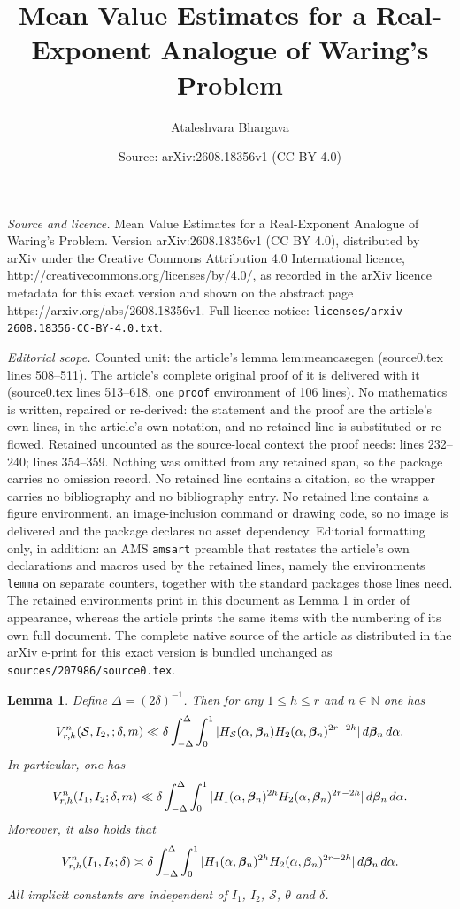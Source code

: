 \documentclass[10pt,a4paper]{amsart}
\title{Mean Value Estimates for a Real-Exponent Analogue of Waring's Problem}
\author{Ataleshvara Bhargava}
\date{Source: arXiv:2608.18356v1 (CC BY 4.0)}
\newtheorem{lemma}{Lemma}
\renewcommand{\d}{\,{\rm d}}
\begin{document}
\maketitle

\noindent\emph{Source and licence.} Mean Value Estimates for a Real-Exponent Analogue of Waring's Problem. Version arXiv:2608.18356v1 (CC BY 4.0), distributed by arXiv under the Creative Commons Attribution 4.0 International licence, http://creativecommons.org/licenses/by/4.0/, as recorded in the arXiv licence metadata for this exact version and shown on the abstract page https://arxiv.org/abs/2608.18356v1. Full licence notice: \texttt{licenses/arxiv-2608.18356-CC-BY-4.0.txt}.\par\smallskip

\noindent\textit{Editorial scope.} Counted unit: the article's lemma lem:meancasegen (source0.tex lines 508--511). The article's complete original proof of it is delivered with it (source0.tex lines 513--618, one \texttt{proof} environment of 106 lines). No mathematics is written, repaired or re-derived: the statement and the proof are the article's own lines, in the article's own notation, and no retained line is substituted or re-flowed.  Retained uncounted as the source-local context the proof needs: lines 232--240; lines 354--359.  Nothing was omitted from any retained span, so the package carries no omission record.  No retained line contains a citation, so the wrapper carries no bibliography and no bibliography entry.  No retained line contains a figure environment, an image-inclusion command or drawing code, so no image is delivered and the package declares no asset dependency.  Editorial formatting only, in addition: an AMS \texttt{amsart} preamble that restates the article's own declarations and macros used by the retained lines, namely the environments \texttt{lemma} on separate counters, together with the standard packages those lines need.  The retained environments print in this document as Lemma 1 in order of appearance, whereas the article prints the same items with the numbering of its own full document.  The complete native source of the article as distributed in the arXiv e-print for this exact version is bundled unchanged as \texttt{sources/207986/source0.tex}.
\begin{lemma} \label{lem:poulcount}
Define $\Delta = (2\delta)^{-1}$. Then for any $1\leq h \leq r$ and $n \in \mathbb{N}$ one has 
\[ V_{r,h}^n(\mathcal{S}, I_2,;\delta,m) \ll \delta \int_{-\Delta}^{\Delta} \int_0^1 |H_{\mathcal{S}}(\alpha,\boldsymbol{\beta}_n)H_2(\alpha,\boldsymbol{\beta}_n)^{2r-2h}| \d \boldsymbol{\beta}_n \d \alpha. \]
In particular, one has 
\[ V_{r,h}^n(I_1, I_2; \delta,m) \ll \delta \int_{-\Delta}^{\Delta} \int_0^1 |H_1(\alpha,\boldsymbol{\beta}_n)^{2h} H_2(\alpha,\boldsymbol{\beta}_n)^{2r-2h}| \d \boldsymbol{\beta}_n \d \alpha. \]
Moreover, it also holds that 
\[ V_{r,h}^n(I_1, I_2; \delta) \asymp \delta \int_{-\Delta}^{\Delta} \int_0^1 |H_1(\alpha,\boldsymbol{\beta}_n)^{2h} H_2(\alpha,\boldsymbol{\beta}_n)^{2r-2h}| \d \boldsymbol{\beta}_n \d \alpha. \]
All implicit constants are independent of $I_1$, $I_2$, $\mathcal{S}$, $\theta$ and $\delta$. 
\end{lemma}
\end{document}
